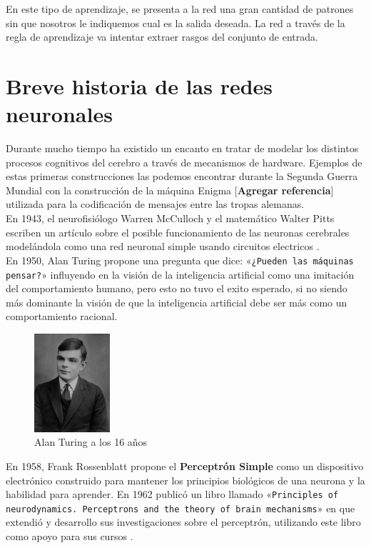 En este tipo de aprendizaje, se presenta a la red una gran cantidad de
patrones sin que nosotros le indiquemos cual es la salida deseada. La
red a través de la regla de aprendizaje va intentar extraer rasgos del conjunto de entrada.

\section{Breve historia de las redes neuronales}

Durante mucho tiempo ha existido un encanto en tratar de modelar los
distintos procesos cognitivos del cerebro a través de mecanismos de
hardware. Ejemplos de estas primeras construcciones las podemos
encontrar durante la Segunda Guerra Mundial con la construcción de la
máquina Enigma [\textbf{Agregar referencia}] utilizada para la
codificación de mensajes entre las tropas alemanas.\\

En 1943, el neurofisiólogo Warren McCulloch y el matemático Walter
Pitts escriben un artículo sobre el posible funcionamiento de las
neuronas cerebrales modelándola como una red neuronal simple usando
circuitos electricos \cite{mcculloch1943logical}.\\

En 1950, Alan Turing propone una pregunta que dice: «\texttt{¿Pueden
 las máquinas pensar?}» \cite{turing1950computing} influyendo en la
visión de la inteligencia artificial como una imitación del
comportamiento humano, pero esto no tuvo el exito esperado, si no
siendo más dominante la visión de que la inteligencia artificial debe
ser más como un comportamiento racional.\\

\begin{figure}
    \centering
    \includegraphics[width=0.25\textwidth]{Alan_Turing}
    \caption{Alan Turing a los 16 años}
    \label{fig:turing}
\end{figure}

En 1958, Frank Rossenblatt propone el \textbf{Perceptrón Simple}
como un dispositivo electrónico construido para mantener los
principios biológicos de una neurona y la habilidad para aprender. En
1962 publicó un libro llamado «\texttt{Principles of
 neurodynamics. Perceptrons and the theory of brain mechanisms}» en
que extendió y desarrollo sus investigaciones sobre el perceptrón,
utilizando este libro como apoyo para sus cursos \cite{rosenblatt1958perceptron}.\\

